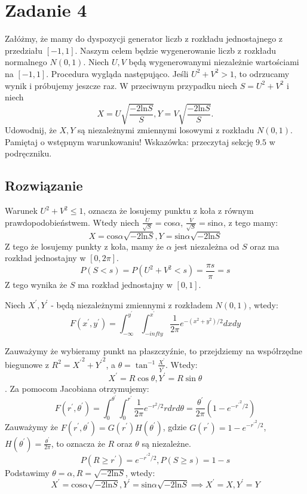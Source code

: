 \section{Zadanie 4}
Załóżmy, że mamy do dyspozycji generator liczb z rozkładu jednostajnego z przedziału \([-1, 1]\).
Naszym celem będzie wygenerowanie liczb z rozkładu normalnego \(N(0,1)\).
Niech \(U,V\) będą wygenerowanymi niezależnie wartościami na \([-1, 1]\).
Procedura wygląda następująco. Jeśli \(U^2+V^2 > 1\), to odrzucamy wynik i próbujemy jeszcze raz.
W przeciwnym przypadku niech \(S = U^2 + V^2\) i niech
\[X = U\sqrt{\frac{-2 \text{ln}S} {S}}, Y = V\sqrt{\frac{-2 \text{ln}S} {S}}.\]
Udowodnij, że \(X,Y\) są niezależnymi zmiennymi losowymi z rozkładu \(N(0,1)\).
Pamiętaj o wstępnym warunkowaniu! Wskazówka: przeczytaj sekcję \(9.5\) w podręczniku.

\subsection*{Rozwiązanie}
Warunek \(U^2+V^2 \le 1\), oznacza że losujemy punktu z koła z równym prawdopodobieństwem.
Wtedy niech \(\frac{U}{\sqrt{S}} = \)cos\(\alpha\), \(\frac{V}{\sqrt{S}} = \)sin\(\alpha\), z tego mamy:
\[X = \text{cos}\alpha\sqrt{-2\text{ln}S}, Y = \text{sin}\alpha\sqrt{-2\text{ln}S}\]
Z tego że losujemy punkty z koła, mamy że \(\alpha\) jest niezależna od \(S\) oraz ma rozkład jednostajny w \([0, 2\pi]\).
\[P(S < s) = P(U^2 + V^2 < s) = \frac{\pi s}{\pi} = s\]
Z tego wynika że \(S\) ma rozkład jednostajny w \([0, 1]\).

Niech \(X^{\prime}, Y^{\prime}\) - będą niezależnymi zmiennymi z rozkładem \(N(0,1)\), wtedy:
\[F(x^\prime, y^\prime) = \int_{-\infty}^{y^\prime}\int_{-infty}^{x^\prime}\frac{1}{2\pi}e^{-(x^2 + y^2)/2}dxdy\]

Zauważymy że wybieramy punkt na płaszczyźnie, to przejdziemy na współrzędne biegunowe z \(R^2 = {X^{\prime}}^2 + {Y^{\prime}}^2\), a \(\theta = \tan^{-1}\frac{X^\prime}{Y^\prime}\).
Wtedy:
\[ X^\prime = R\cos\theta, Y^\prime = R\sin\theta\].
Za pomocom Jacobiana otrzymujemy:
\[F(r^\prime, \theta^\prime) = \int_{0}^{\theta^\prime}\int_{0}^{r^\prime}\frac{1}{2\pi}e^{-r^2/2}rdrd\theta = \frac{\theta^\prime}{2\pi}(1 - e^{-{r^\prime}^2/2})\]
Zauważymy że \(F(r^\prime, \theta^\prime) = G(r^\prime)H(\theta^\prime)\), gdzie \(G(r^\prime) = 1 - e^{-{r^\prime}^2/2}\), \(H(\theta^\prime) = \frac{\theta^\prime}{2\pi}\), to oznacza że \(R\) oraz \(\theta\) są niezależne.
\[ P(R \ge r^\prime) = e^{-{r^\prime}^2/2}, P(S \ge s) = 1 - s\]
Podstawimy \(\theta = \alpha, R = \sqrt{-2\text{ln}S}\), wtedy:
\[X^\prime = \text{cos}\alpha\sqrt{-2\text{ln}S}, Y^\prime = \text{sin}\alpha\sqrt{-2\text{ln}S} \implies X^\prime = X, Y^\prime = Y\]

